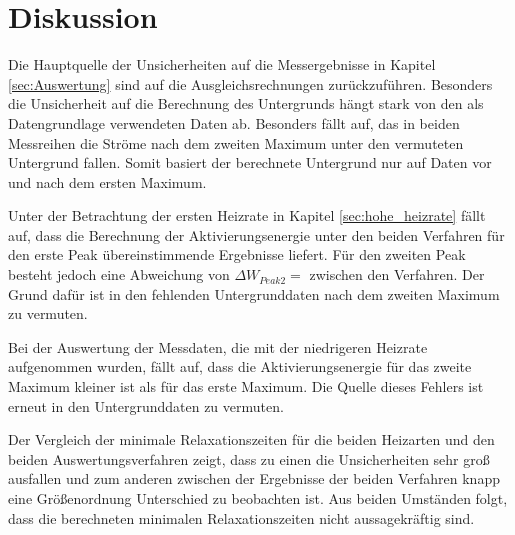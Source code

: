 \section{Diskussion}
\label{sec:Diskussion}
Die Hauptquelle der Unsicherheiten auf die Messergebnisse in Kapitel \ref{sec:Auswertung} sind auf die Ausgleichsrechnungen zurückzuführen. Besonders die Unsicherheit auf die Berechnung des Untergrunds hängt stark von den als Datengrundlage verwendeten Daten ab. Besonders fällt auf, das in beiden Messreihen die Ströme nach dem zweiten Maximum unter den vermuteten Untergrund fallen. Somit basiert der berechnete Untergrund nur auf Daten vor und nach dem ersten Maximum. 

Unter der Betrachtung der ersten Heizrate in Kapitel \ref{sec:hohe_heizrate} fällt auf, dass die Berechnung der Aktivierungsenergie unter den beiden Verfahren für den erste Peak übereinstimmende Ergebnisse liefert. Für den zweiten Peak besteht jedoch eine Abweichung von $\Delta W_{Peak2}= $ zwischen den Verfahren. Der Grund dafür ist in den fehlenden Untergrunddaten nach dem zweiten Maximum zu vermuten. 

Bei der Auswertung der Messdaten, die mit der niedrigeren Heizrate aufgenommen wurden, fällt auf, dass die Aktivierungsenergie für das zweite Maximum kleiner ist als für das erste Maximum. Die Quelle dieses Fehlers ist erneut in den Untergrunddaten zu vermuten.

Der Vergleich der minimale Relaxationszeiten für die beiden Heizarten und den beiden Auswertungsverfahren zeigt, dass zu einen die Unsicherheiten sehr groß ausfallen und zum anderen zwischen der Ergebnisse der beiden Verfahren knapp eine Größenordnung Unterschied zu beobachten ist. Aus beiden Umständen folgt, dass die berechneten minimalen Relaxationszeiten nicht aussagekräftig sind. 